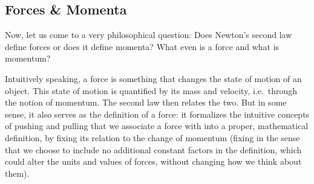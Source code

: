 \documentclass[../class_mech_main.tex]{subfiles}
\begin{document}
        \subsection{Forces \& Momenta}
		\label{sec:forces_and_momenta}
% 
% 




Now, let us come to a very philosophical question: Does Newton's second law define forces or does it define momenta? What even is a force and what is momentum?

Intuitively speaking, a force is something that changes the state of motion of an object. This state of motion is quantified by its mass and velocity, i.e.~through the notion of momentum. The second law then relates the two. But in some sense, it also serves as the definition of a force: it formalizes the intuitive concepts of pushing and pulling that we associate a force with into a proper, mathematical definition, by fixing its relation to the change of momentum (fixing in the sense that we choose to include no additional constant factors in the definition, which could alter the units and values of forces, without changing how we think about them).
\end{document}

